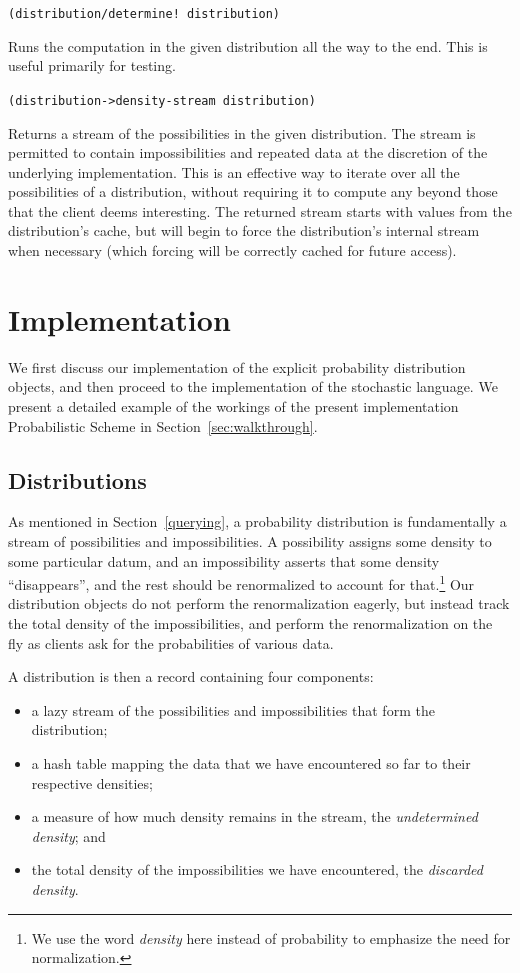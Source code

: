 \documentclass[10pt]{sigplanconf}
\newcommand{\concept}[1]{\textit{#1}}
\newenvironment{documentation}[1]{\vspace{5pt} \noindent \texttt{#1} \nopagebreak \begin{list}{}{\leftmargin 0.7cm}\item}{\end{list}}
\begin{document}
\begin{documentation}{(distribution/determine!\ distribution)}
Runs the computation in the given distribution all the way to the end.
This is useful primarily for testing.
\end{documentation}

\begin{documentation}{(distribution->density-stream distribution)}
Returns a stream of the possibilities in the given distribution.  The
stream is permitted to contain impossibilities and repeated data at
the discretion of the underlying implementation.  This is an effective
way to iterate over all the possibilities of a distribution, without
requiring it to compute any beyond those that the client deems
interesting.  The returned stream starts with values from the
distribution's cache, but will begin to force the distribution's
internal stream when necessary (which forcing will be correctly cached
for future access).
\end{documentation}

\section{Implementation}
\label{implementation}

We first discuss our implementation of the explicit probability
distribution objects, and then proceed to the implementation of the
stochastic language.  We present a detailed example of the workings of
the present implementation Probabilistic Scheme in
Section~\ref{sec:walkthrough}.

\subsection{Distributions}

As mentioned in Section~\ref{querying}, a probability distribution is
fundamentally a stream of possibilities and impossibilities.  A
possibility assigns some density to some particular datum, and an
impossibility asserts that some density ``disappears'', and the rest
should be renormalized to account for that.\footnote{We use the word
\concept{density} here instead of probability to emphasize the need
for normalization.}  Our distribution
objects do not perform the renormalization eagerly, but instead track
the total density of the impossibilities, and perform the
renormalization on the fly as clients ask for the probabilities of
various data.

A distribution is then a record containing four components:
\begin{itemize}
 \item a lazy stream of the possibilities and impossibilities
   that form the distribution;
 \item a hash table mapping the data that we have encountered so far
   to their respective densities;
 \item a measure of how much density remains in
   the stream, the \concept{undetermined density}; and
 \item the total density of the impossibilities we have encountered, the
   \concept{discarded density}.
\end{itemize}
\end{document}
